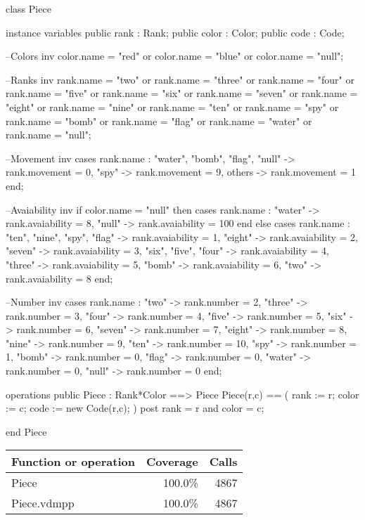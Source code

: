 \begin{vdm_al}
class Piece

 instance variables
  public rank : Rank;
  public color : Color;
  public code : Code;
  
 --Colors
 inv color.name = "red" or
   color.name = "blue" or
   color.name = "null";
 
 --Ranks
 inv rank.name = "two" or
   rank.name = "three" or
   rank.name = "four" or
   rank.name = "five" or
   rank.name = "six" or
   rank.name = "seven" or
   rank.name = "eight" or
   rank.name = "nine" or
   rank.name = "ten" or
   rank.name = "spy" or
   rank.name = "bomb" or
   rank.name = "flag" or
   rank.name = "water" or
   rank.name = "null";
   
 --Movement
 inv cases rank.name :
  "water", "bomb", "flag", "null" -> rank.movement = 0,
  "spy" -> rank.movement = 9,
  others -> rank.movement = 1
  end;
   
 --Avaiability
 inv if color.name = "null"
  then
   cases rank.name :
    "water" -> rank.avaiability = 8,
    "null" -> rank.avaiability = 100
   end
  else
   cases rank.name :
    "ten", "nine", "spy", "flag" -> rank.avaiability = 1,
    "eight" -> rank.avaiability = 2,
    "seven" -> rank.avaiability = 3,
    "six", "five", "four" -> rank.avaiability = 4,
    "three" -> rank.avaiability = 5,
    "bomb" -> rank.avaiability = 6,
    "two" -> rank.avaiability = 8
   end;
   
 --Number
 inv cases rank.name :
    "two" -> rank.number = 2,
    "three" -> rank.number = 3,
    "four" -> rank.number = 4,
    "five" -> rank.number = 5,
    "six" -> rank.number = 6,
    "seven" -> rank.number = 7,
    "eight" -> rank.number = 8,
    "nine" -> rank.number = 9,
    "ten" -> rank.number = 10,
    "spy" -> rank.number = 1,
    "bomb" -> rank.number = 0,
    "flag" -> rank.number = 0,
    "water" -> rank.number = 0,
    "null" -> rank.number = 0
   end;

 operations
  public Piece : Rank*Color ==> Piece
   Piece(r,c) == 
   (
    rank := r;
    color := c;
    code := new Code(r,c);
   )
   post rank = r and color = c;
  
end Piece
\end{vdm_al}
\bigskip
\begin{longtable}{|l|r|r|}
\hline
Function or operation & Coverage & Calls \\
\hline
\hline
Piece & 100.0\% & 4867 \\
\hline
\hline
Piece.vdmpp & 100.0\% & 4867 \\
\hline
\end{longtable}

